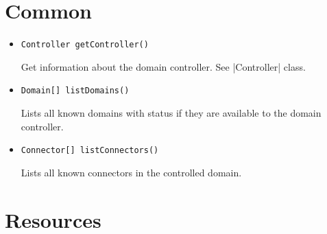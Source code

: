 \documentclass[a4paper]{report}
\newenvironment{Api}{\begin{itemize}}{\end{itemize}}
\newcommand{\ApiCode}[1]{\lstinline[style=styleApi]|#1|}
\newcommand{\ApiItem}[1]{\item #1 %

}
\newcommand{\ApiCmd}[1]{\ApiItem{\ApiCode{#1}}}
\newcommand{\ApiClass}[2]{\ApiItem{%
  \ifx&#2& \ApiCode{class #1} \else \ApiCode{class #1 extends #2} \fi}%
}
\newenvironment{ApiClassAttributes}{%

\begin{samepage}\textbf{Attributes:}\begin{compactitem}}{\end{compactitem}\end{samepage}}
\newcommand{\ApiReadOnly}{{\color{red!50!black}\textbf{ReadOnly}}}
\newcommand{\ApiClassAttribute}[3]{\ApiItem{\ApiCode{#2} \ApiCode{#1} \hspace{1mm}(\ifx&#3&\ApiReadOnly\else#3\fi)
}}
\newcommand{\UCref}[1]{UC-\ref{UC:#1}}
\begin{document}
\begin{Api}

\end{Api}

\section{Common}

\begin{Api}

\ApiCmd{Controller getController()}
Get information about the domain controller. See |Controller| class.

\ApiCmd{Domain[] listDomains()}
Lists all known domains with status if they are available to the domain controller.

\ApiCmd{Connector[] listConnectors()}
Lists all known connectors in the controlled domain.

\end{Api}


\section{Resources}
\end{document}
